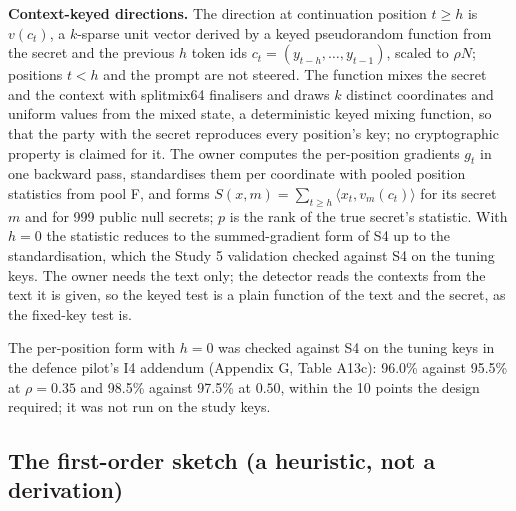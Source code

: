 \documentclass[11pt,letterpaper]{article}
\begin{document}
\textbf{Context-keyed directions.} The direction at continuation position \(t \geq h\) is \(v(c_t)\), a \(k\)-sparse unit vector derived by a keyed pseudorandom function from the secret and the previous \(h\) token ids \(c_t = (y_{t-h}, \dots, y_{t-1})\), scaled to \(\rho N\); positions \(t < h\) and the prompt are not steered. The function mixes the secret and the context with splitmix64 finalisers \citep{steele2014splitmix} and draws \(k\) distinct coordinates and uniform values from the mixed state, a deterministic keyed mixing function, so that the party with the secret reproduces every position's key; no cryptographic property is claimed for it. The owner computes the per-position gradients \(g_t\) in one backward pass, standardises them per coordinate with pooled position statistics from pool F, and forms \(S(x, m) = \sum_{t \geq h} \langle x_t, v_m(c_t) \rangle\) for its secret \(m\) and for 999 public null secrets; \(p\) is the rank of the true secret's statistic. With \(h = 0\) the statistic reduces to the summed-gradient form of S4 up to the standardisation, which the Study 5 validation checked against S4 on the tuning keys. The owner needs the text only; the detector reads the contexts from the text it is given, so the keyed test is a plain function of the text and the secret, as the fixed-key test is.

The per-position form with \(h = 0\) was checked against S4 on the tuning keys in the defence pilot's I4 addendum (Appendix G, Table A13c): 96.0\% against 95.5\% at \(\rho = 0.35\) and 98.5\% against 97.5\% at \(0.50\), within the 10 points the design required; it was not run on the study keys.

\hypertarget{the-first-order-sketch-a-heuristic-not-a-derivation}{%
\subsection{The first-order sketch (a heuristic, not a derivation)}\label{the-first-order-sketch-a-heuristic-not-a-derivation}}
\end{document}
